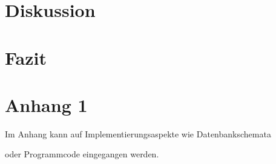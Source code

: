 \documentclass[pdftex,12pt,a4paper]{report}
\begin{document}
\chapter{Diskussion}
\label{chp:diskussion}



\chapter{Fazit}
\label{chp:fazit}




\appendix


\chapter{Anhang 1}

Im Anhang kann auf Implementierungsaspekte wie Datenbankschemata

oder Programmcode eingegangen werden.



\listoffigures



\listoftables



    



\end{document}
